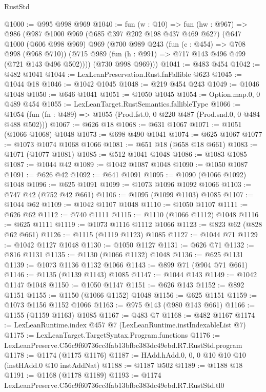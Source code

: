 \begin{lexlean}{RustStd}
\begin{coremodule}
@1000 := @995 @998 @969
@1040 := fun (w : @10) =>
  fun (hw : @967) =>
  @986
    (@987
      @1000
      @969
      (@685 @397 @202 @198 @437 @469 @627)
      (@647
        @1000
        (@606 @998 @969)
        @969
        (@700
          @989
          @243
          (fun (c : @454) => @708 @998 (@968 @710))
          (@715 @989 (fun (h : @991) => @717 @143 @496 @499 (@721 @143 @496 @502))))
        (@730 @998 @969)))
@1041 := @483 @454
@1042 := @482 @1041
@1044 := LexLeanPreservation.Rust.fnFallible @623
@1045 := @1044 @18
@1046 := @1042 @1045
@1048 := @219 @454 @243
@1049 := @1046 @1048
@1050 := @646 @1041
@1051 := @1050 @1045
@1054 := Option.map.{0, 0} @489 @454
@1055 := LexLeanTarget.RustSemantics.fallibleType
@1066 := @1054
    (fun (fn : @489) => @1055 (Prod.fst.{0, 0} @220 @487 (Prod.snd.{0, 0} @484 @488 @502)))
@1067 := @626 @18
@1068 := @631 @1067
@1071 := @1051 (@1066 @1068) @1048
@1073 := @698 @490 @1041
@1074 := @625 @1067
@1077 := @1073 @1074 @1068 @1066
@1081 := @651 @18 (@658 @18 @661)
@1083 := @1071 (@1077 @1081)
@1085 := @512 @1041 @1048
@1086 := @1083 @1085
@1087 := @1044 @42
@1089 := @1042 @1087 @1048
@1090 := @1050 @1087
@1091 := @626 @42
@1092 := @641 @1091
@1095 := @1090 (@1066 @1092) @1048
@1096 := @625 @1091
@1099 := @1073 @1096 @1092 @1066
@1103 := @747 @42 (@752 @42 @661)
@1106 := @1095 (@1099 @1103) @1085
@1107 := @1044 @62
@1109 := @1042 @1107 @1048
@1110 := @1050 @1107
@1111 := @626 @62
@1112 := @740 @1111
@1115 := @1110 (@1066 @1112) @1048
@1116 := @625 @1111
@1119 := @1073 @1116 @1112 @1066
@1123 := @823 @62 (@828 @62 @661)
@1126 := @1115 (@1119 @1123) @1085
@1127 := @1044 @71
@1129 := @1042 @1127 @1048
@1130 := @1050 @1127
@1131 := @626 @71
@1132 := @816 @1131
@1135 := @1130 (@1066 @1132) @1048
@1136 := @625 @1131
@1139 := @1073 @1136 @1132 @1066
@1143 := @899 @71 (@904 @71 @661)
@1146 := @1135 (@1139 @1143) @1085
@1147 := @1044 @143
@1149 := @1042 @1147 @1048
@1150 := @1050 @1147
@1151 := @626 @143
@1152 := @892 @1151
@1155 := @1150 (@1066 @1152) @1048
@1156 := @625 @1151
@1159 := @1073 @1156 @1152 @1066
@1163 := @975 @143 (@980 @143 @661)
@1166 := @1155 (@1159 @1163) @1085
@1167 := @483 @7
@1168 := @482 @1167
@1174 := LexLeanRuntime.index @457 @7 (LexLeanRuntime.instIndexableList @7)
@1175 := LexLeanTarget.TargetSyntax.Program.functions
@1176 := LexLeanPreserve.C56c9f60736cc3fab13bfbc383dc49ebd.R7.RustStd.program
@1178 := @1174 (@1175 @1176)
@1187 := HAdd.hAdd.{0, 0, 0} @10 @10 @10 (instHAdd.{0} @10 instAddNat)
@1188 := @1187 @502
@1189 := @1188 @18
@1191 := @1168 (@1178 @1189)
@1193 := @1174 LexLeanPreserve.C56c9f60736cc3fab13bfbc383dc49ebd.R7.RustStd.tl0

\end{coremodule}
\end{lexlean}
